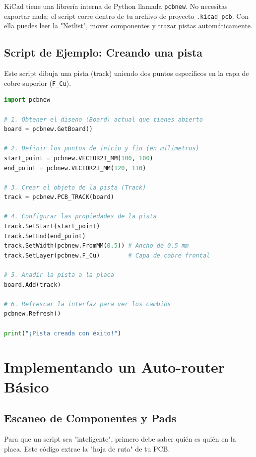 \documentclass[12pt, a4paper]{article}
\begin{document}
KiCad tiene una librería interna de Python llamada \texttt{pcbnew}. No necesitas exportar nada; el script corre dentro de tu archivo de proyecto \texttt{.kicad\_pcb}. Con ella puedes leer la "Netlist", mover componentes y trazar pistas automáticamente.

\subsection{Script de Ejemplo: Creando una pista}

Este script dibuja una pista (track) uniendo dos puntos específicos en la capa de cobre superior (\texttt{F\_Cu}).

\begin{lstlisting}[language=Python, caption=Creando una pista programáticamente en KiCad]
import pcbnew

# 1. Obtener el diseno (Board) actual que tienes abierto
board = pcbnew.GetBoard()

# 2. Definir los puntos de inicio y fin (en milimetros)
start_point = pcbnew.VECTOR2I_MM(100, 100)
end_point = pcbnew.VECTOR2I_MM(120, 110)

# 3. Crear el objeto de la pista (Track)
track = pcbnew.PCB_TRACK(board)

# 4. Configurar las propiedades de la pista
track.SetStart(start_point)
track.SetEnd(end_point)
track.SetWidth(pcbnew.FromMM(0.5)) # Ancho de 0.5 mm
track.SetLayer(pcbnew.F_Cu)        # Capa de cobre frontal

# 5. Anadir la pista a la placa
board.Add(track)

# 6. Refrescar la interfaz para ver los cambios
pcbnew.Refresh()

print("¡Pista creada con éxito!")
\end{lstlisting}

\section{Implementando un Auto-router Básico}

\subsection{Escaneo de Componentes y Pads}

Para que un script sea "inteligente", primero debe saber quién es quién en la placa. Este código extrae la "hoja de ruta" de tu PCB.
\end{document}
